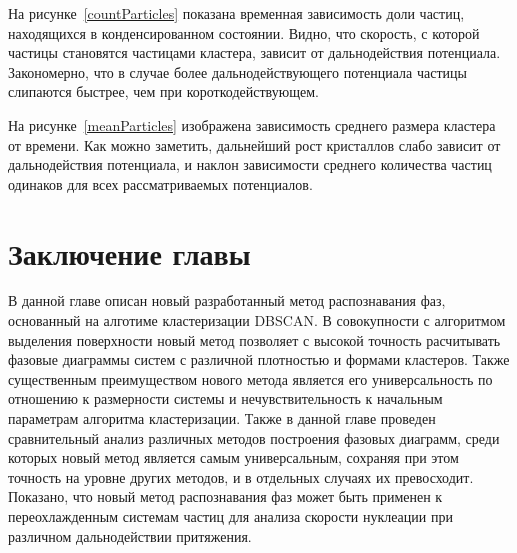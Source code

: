 На рисунке~\ref{countParticles} показана временная зависимость доли частиц, находящихся в конденсированном состоянии. Видно, что скорость, с которой частицы становятся частицами кластера, зависит от дальнодействия потенциала. Закономерно, что в случае более дальнодействующего потенциала частицы слипаются быстрее, чем при короткодействующем.


На рисунке~\ref{meanParticles} изображена зависимость среднего размера кластера от времени. Как можно заметить, дальнейший рост кристаллов слабо зависит от дальнодействия потенциала, и наклон зависимости среднего количества частиц одинаков для всех рассматриваемых потенциалов.


\section{Заключение главы}
\label{PRIMe-SecConclusions}

В данной главе описан новый разработанный метод распознавания фаз, основанный на алготиме кластеризации DBSCAN. В совокупности с алгоритмом выделения поверхности новый метод позволяет с высокой точность расчитывать фазовые диаграммы систем с различной плотностью и формами кластеров. Также существенным преимуществом нового метода является его универсальность по отношению к размерности системы и нечувствительность к начальным параметрам алгоритма кластеризации. Также в данной главе проведен сравнительный анализ различных методов построения фазовых диаграмм, среди которых новый метод является самым универсальным, сохраняя при этом точность на уровне других методов, и в отдельных случаях их превосходит. Показано, что новый метод распознавания фаз может быть применен к переохлажденным системам частиц для анализа скорости нуклеации при различном дальнодействии притяжения.
